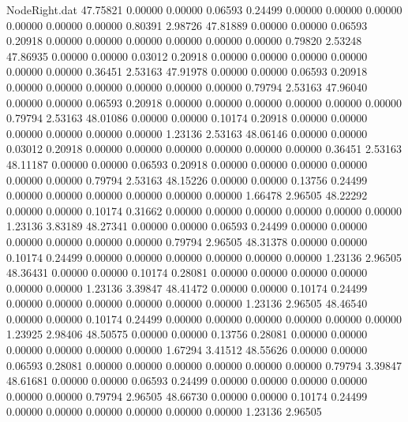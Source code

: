 \begin{filecontents}{NodeRight.dat}
  47.75821    0.00000    0.00000     0.06593    0.24499    0.00000    0.00000    0.00000    0.00000    0.00000    0.00000    0.80391    2.98726
  47.81889    0.00000    0.00000     0.06593    0.20918    0.00000    0.00000    0.00000    0.00000    0.00000    0.00000    0.79820    2.53248
  47.86935    0.00000    0.00000     0.03012    0.20918    0.00000    0.00000    0.00000    0.00000    0.00000    0.00000    0.36451    2.53163
  47.91978    0.00000    0.00000     0.06593    0.20918    0.00000    0.00000    0.00000    0.00000    0.00000    0.00000    0.79794    2.53163
  47.96040    0.00000    0.00000     0.06593    0.20918    0.00000    0.00000    0.00000    0.00000    0.00000    0.00000    0.79794    2.53163
  48.01086    0.00000    0.00000     0.10174    0.20918    0.00000    0.00000    0.00000    0.00000    0.00000    0.00000    1.23136    2.53163
  48.06146    0.00000    0.00000     0.03012    0.20918    0.00000    0.00000    0.00000    0.00000    0.00000    0.00000    0.36451    2.53163
  48.11187    0.00000    0.00000     0.06593    0.20918    0.00000    0.00000    0.00000    0.00000    0.00000    0.00000    0.79794    2.53163
  48.15226    0.00000    0.00000     0.13756    0.24499    0.00000    0.00000    0.00000    0.00000    0.00000    0.00000    1.66478    2.96505
  48.22292    0.00000    0.00000     0.10174    0.31662    0.00000    0.00000    0.00000    0.00000    0.00000    0.00000    1.23136    3.83189
  48.27341    0.00000    0.00000     0.06593    0.24499    0.00000    0.00000    0.00000    0.00000    0.00000    0.00000    0.79794    2.96505
  48.31378    0.00000    0.00000     0.10174    0.24499    0.00000    0.00000    0.00000    0.00000    0.00000    0.00000    1.23136    2.96505
  48.36431    0.00000    0.00000     0.10174    0.28081    0.00000    0.00000    0.00000    0.00000    0.00000    0.00000    1.23136    3.39847
  48.41472    0.00000    0.00000     0.10174    0.24499    0.00000    0.00000    0.00000    0.00000    0.00000    0.00000    1.23136    2.96505
  48.46540    0.00000    0.00000     0.10174    0.24499    0.00000    0.00000    0.00000    0.00000    0.00000    0.00000    1.23925    2.98406
  48.50575    0.00000    0.00000     0.13756    0.28081    0.00000    0.00000    0.00000    0.00000    0.00000    0.00000    1.67294    3.41512
  48.55626    0.00000    0.00000     0.06593    0.28081    0.00000    0.00000    0.00000    0.00000    0.00000    0.00000    0.79794    3.39847
  48.61681    0.00000    0.00000     0.06593    0.24499    0.00000    0.00000    0.00000    0.00000    0.00000    0.00000    0.79794    2.96505
  48.66730    0.00000    0.00000     0.10174    0.24499    0.00000    0.00000    0.00000    0.00000    0.00000    0.00000    1.23136    2.96505

\end{filecontents}
